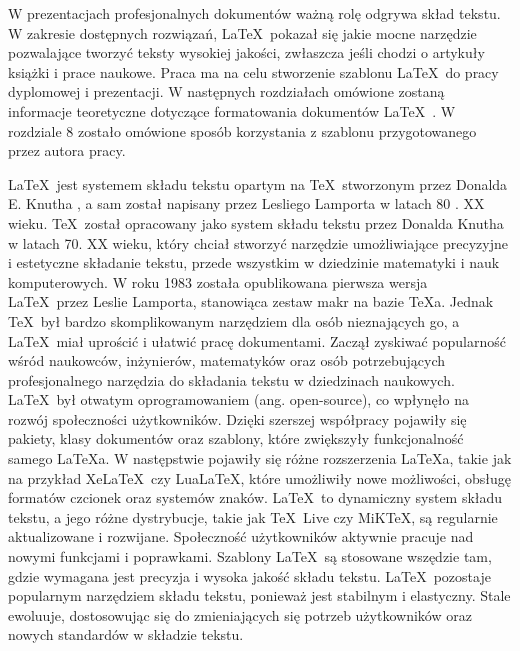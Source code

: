 
W prezentacjach profesjonalnych dokumentów ważną rolę odgrywa skład tekstu. W zakresie dostępnych rozwiązań, \LaTeX\ pokazał się jakie mocne narzędzie pozwalające tworzyć teksty wysokiej jakości, zwłaszcza jeśli chodzi o artykuły książki i prace naukowe. Praca ma na celu stworzenie szablonu \LaTeX\ do pracy dyplomowej i prezentacji. W następnych rozdziałach omówione zostaną informacje teoretyczne dotyczące formatowania dokumentów \LaTeX\ . W rozdziale 8 zostało omówione sposób korzystania z szablonu przygotowanego przez autora pracy.
 
\LaTeX\ jest systemem składu tekstu opartym na \TeX\ stworzonym przez Donalda E. Knutha \cite{knuth1996texbook}, a sam został napisany przez Lesliego Lamporta w latach 80 \cite{lamport1985latex}. XX wieku. \TeX\  został opracowany jako system składu tekstu przez Donalda Knutha w latach 70. XX wieku, który chciał stworzyć narzędzie umożliwiające precyzyjne i estetyczne składanie tekstu, przede wszystkim w dziedzinie matematyki i nauk komputerowych. W roku 1983 została opublikowana pierwsza wersja \LaTeX\ przez Leslie Lamporta, stanowiąca zestaw makr na bazie \TeX{a}. Jednak \TeX\ był bardzo skomplikowanym narzędziem dla osób nieznających go, a \LaTeX\ miał uprościć i ułatwić pracę dokumentami. Zaczął zyskiwać popularność wśród naukowców, inżynierów, matematyków oraz osób potrzebujących profesjonalnego narzędzia do składania tekstu w dziedzinach naukowych. \LaTeX\ był  otwatym oprogramowaniem (ang. open-source), co wpłynęło na rozwój społeczności użytkowników. Dzięki szerszej współpracy pojawiły się pakiety, klasy dokumentów oraz szablony, które zwiększyły funkcjonalność samego \LaTeX{a}. W następstwie pojawiły się różne rozszerzenia \LaTeX{a}, takie jak na przykład Xe\LaTeX\ czy Lua\LaTeX, które umożliwiły nowe możliwości, obsługę formatów czcionek oraz systemów znaków. \LaTeX\ to dynamiczny system składu tekstu, a jego różne dystrybucje, takie jak \TeX\ Live czy MiKTeX, są regularnie aktualizowane i rozwijane. Społeczność użytkowników aktywnie pracuje nad nowymi funkcjami i poprawkami. Szablony \LaTeX\ są stosowane wszędzie tam, gdzie wymagana jest precyzja i wysoka jakość składu tekstu. \LaTeX\ pozostaje popularnym narzędziem składu tekstu, ponieważ jest stabilnym i elastyczny. Stale ewoluuje, dostosowując się do zmieniających się potrzeb użytkowników oraz nowych standardów w składzie tekstu.

